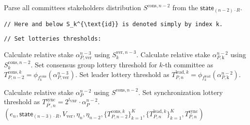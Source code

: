 \begin{protocol}
\begin{algorithmic}[1]
        \State Parse all committees stakeholders distribution $S^{\text{cons}, n - 2}$ from the $\textsf{state}_{(n - 2)\cdot R}$.

        \noindent
        \lstinline|// Here and below S_k^{\text{id}} is denoted simply by index k.|

        \noindent
        \lstinline|// Set lotteries thresholds:|

            \State Calculate relative stake $\alpha^{n-3}_{P, \text{ver}}$ using $S_k^{\text{ver}, {n - 3}}$.
            \State Calculate relative stake $\alpha^{n-2}_{P, \text{k}}$ using $S_k^{\text{cons}, {n - 2}}$.
            \State Set consensus group lottery threshold for $k$-th committee as $T_{P, n-2}^{\text{cons}, k} = \phi_{f^{\text{cons}}_k}(\alpha^{n-3}_{P, \text{ver}})$.
            \State Set leader lottery threshold as $T_{P, n}^{\text{lead}, k} = \phi_{f^{\text{lead}}_k}(\alpha^{n-2}_{P, \text{k}})$.
        \EndFor

        \State Calculate relative stake $\alpha^{n-2}_{P}$ using $S^{\text{cons}, {n - 2}}$.
        \State Set synchronization lottery threshold as $T_{P', n}^{\text{sync}} = 2^{l_{\text{VRF}}} \cdot \alpha^{n-2}_{P}$.
        \State \Return ${(e_n, \textsf{state}_{(n - 3)\cdot R}, V_{\text{ver}}, \eta_{n}, \eta_{n - 2}, \{T_{P, n-2}^{\text{cons}, k}\}_{k=1}^K, \{T_{P, n}^{\text{lead}, k}\}_{k=1}^K, T_{P, n}^{\text{sync}})}$
    \end{algorithmic}\label{alg:upd-stake}
\end{protocol}


